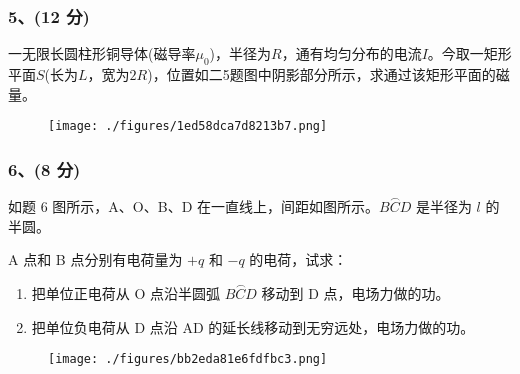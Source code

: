 \subsubsection{5、(12 分)}
一无限长圆柱形铜导体(磁导率$\mu_0$)，半径为$R$，通有均匀分布的电流$I$。今取一矩形平面$S$(长为$L$，宽为$2R$)，位置如二5题图中阴影部分所示，求通过该矩形平面的磁量。
\begin{figure}[ht]
\centering
\texttt{[image: ./figures/1ed58dca7d8213b7.png]}
\caption{} \label{fig_CD13_5}
\end{figure}
\subsubsection{6、(8 分)}
如题 6 图所示，A、O、B、D 在一直线上，间距如图所示。$ \overset{\frown}{BCD} $ 是半径为 $l$ 的半圆。

A 点和 B 点分别有电荷量为 $+q$ 和 $-q$ 的电荷，试求：
\begin{enumerate}
\item 把单位正电荷从 O 点沿半圆弧 $\overset{\frown}{BCD}$ 移动到 D 点，电场力做的功。
\item 把单位负电荷从 D 点沿 AD 的延长线移动到无穷远处，电场力做的功。
\end{enumerate}


\begin{figure}[ht]
\centering
\texttt{[image: ./figures/bb2eda81e6fdfbc3.png]}
\caption{} \label{fig_CD13_6}
\end{figure}